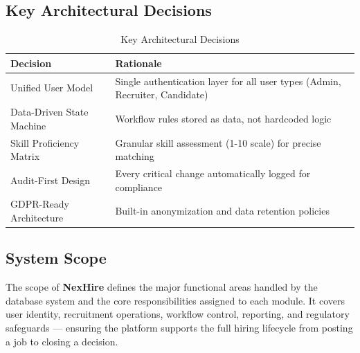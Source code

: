 \documentclass[11pt,a4paper]{article}
\begin{document}
\subsection{Key Architectural Decisions}
\begin{table}[H]
    \centering
    \begin{tabularx}{\textwidth}{|l|X|}
        \hline
        \rowcolor{tableheader}
        \textbf{Decision} & \textbf{Rationale} \\
        \hline
        Unified User Model & Single authentication layer for all user types (Admin, Recruiter, Candidate) \\
        \hline
        Data-Driven State Machine & Workflow rules stored as data, not hardcoded logic \\
        \hline
        Skill Proficiency Matrix & Granular skill assessment (1-10 scale) for precise matching \\
        \hline
        Audit-First Design & Every critical change automatically logged for compliance \\
        \hline
        GDPR-Ready Architecture & Built-in anonymization and data retention policies \\
        \hline
    \end{tabularx}
    \caption{Key Architectural Decisions}
\end{table}

\subsection{System Scope}
\noindent
The scope of \textbf{NexHire} defines the major functional areas handled by the database system and the core responsibilities assigned to each module. It covers user identity, recruitment operations, workflow control, reporting, and regulatory safeguards --- ensuring the platform supports the full hiring lifecycle from posting a job to closing a decision.
\end{document}
